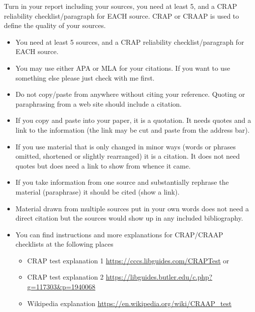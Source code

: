 \documentclass[12pt]{article}
\begin{document}
    Turn in your report including your sources, you need at least 5, and a CRAP reliability checklist/paragraph for EACH  source. CRAP or CRAAP is used to define the quality of your sources. 
    \begin{itemize}

        \item You need at least 5 sources, and a CRAP reliability checklist/paragraph for EACH  source. 
        \item You may use either APA or MLA for your citations. If you want to use something else please just check with me first.
        \item Do not copy/paste from anywhere without citing your reference. Quoting or paraphrasing from a web site should include a citation.
        \item If you copy and paste into your paper, it is a quotation. It needs quotes and a link to the information (the link may be cut and paste from the address bar).
        \item If you use material that is only changed in minor ways (words or phrases omitted, shortened or slightly rearranged) it is a citation. It does not need quotes but does need a link to show from whence it came.
        \item If you take information from one source and substantially rephrase the material (paraphrase) it should be cited (show a link).
        \item Material drawn from multiple sources put in your own words does not need a direct citation but the sources would show up in any included bibliography.
         \item You can find instructions and more explanations for CRAP/CRAAP checklists at the following places
        \begin{itemize}
            \item CRAP test explanation 1 \url{ https://cccs.libguides.com/CRAPTest} or 
            \item CRAP test explanation 2 \url{https://libguides.butler.edu/c.php?g=117303&p=1940068} 
            \item Wikipedia explanation \url{https://en.wikipedia.org/wiki/CRAAP_test}
        \end{itemize}
    \end{itemize}    
\end{document}
